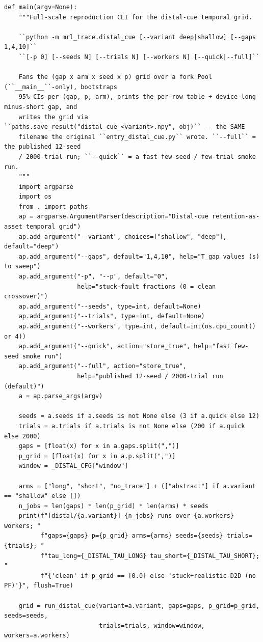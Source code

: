 \begin{lstlisting}[caption={mrl\_trace/distal\_cue.py},label={lst:siox-src-distal_cue}]
def main(argv=None):
    """Full-scale reproduction CLI for the distal-cue temporal grid.

    ``python -m mrl_trace.distal_cue [--variant deep|shallow] [--gaps 1,4,10]``
    ``[-p 0] [--seeds N] [--trials N] [--workers N] [--quick|--full]``

    Fans the (gap x arm x seed x p) grid over a fork Pool (``__main__``-only), bootstraps
    95% CIs per (gap, p, arm), prints the per-row table + device-long-minus-short gap, and
    writes the grid via ``paths.save_result("distal_cue_<variant>.npy", obj)`` -- the SAME
    filename the original ``entry_distal_cue.py`` wrote. ``--full`` = the published 12-seed
    / 2000-trial run; ``--quick`` = a fast few-seed / few-trial smoke run.
    """
    import argparse
    import os
    from . import paths
    ap = argparse.ArgumentParser(description="Distal-cue retention-as-asset temporal grid")
    ap.add_argument("--variant", choices=["shallow", "deep"], default="deep")
    ap.add_argument("--gaps", default="1,4,10", help="T_gap values (s) to sweep")
    ap.add_argument("-p", "--p", default="0",
                    help="stuck-fault fractions (0 = clean crossover)")
    ap.add_argument("--seeds", type=int, default=None)
    ap.add_argument("--trials", type=int, default=None)
    ap.add_argument("--workers", type=int, default=int(os.cpu_count() or 4))
    ap.add_argument("--quick", action="store_true", help="fast few-seed smoke run")
    ap.add_argument("--full", action="store_true",
                    help="published 12-seed / 2000-trial run (default)")
    a = ap.parse_args(argv)

    seeds = a.seeds if a.seeds is not None else (3 if a.quick else 12)
    trials = a.trials if a.trials is not None else (200 if a.quick else 2000)
    gaps = [float(x) for x in a.gaps.split(",")]
    p_grid = [float(x) for x in a.p.split(",")]
    window = _DISTAL_CFG["window"]

    arms = ["long", "short", "no_trace"] + (["abstract"] if a.variant == "shallow" else [])
    n_jobs = len(gaps) * len(p_grid) * len(arms) * seeds
    print(f"[distal/{a.variant}] {n_jobs} runs over {a.workers} workers; "
          f"gaps={gaps} p={p_grid} arms={arms} seeds={seeds} trials={trials}; "
          f"tau_long={_DISTAL_TAU_LONG} tau_short={_DISTAL_TAU_SHORT}; "
          f"{'clean' if p_grid == [0.0] else 'stuck+realistic-D2D (no PF)'}", flush=True)

    grid = run_distal_cue(variant=a.variant, gaps=gaps, p_grid=p_grid, seeds=seeds,
                          trials=trials, window=window, workers=a.workers)


\end{lstlisting}
